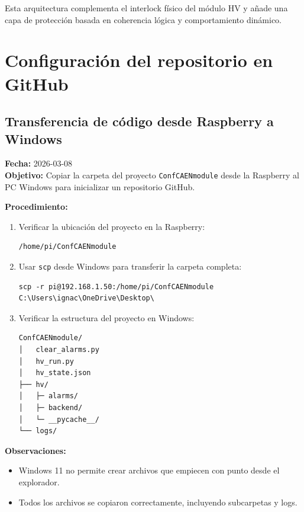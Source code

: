 \documentclass{article}
\begin{document}
Esta arquitectura complementa el interlock físico del módulo HV y añade
una capa de protección basada en coherencia lógica y comportamiento dinámico.

\section{Configuración del repositorio en GitHub}

\subsection{Transferencia de código desde Raspberry a Windows}

\textbf{Fecha:} 2026-03-08 \\
\textbf{Objetivo:} Copiar la carpeta del proyecto \texttt{ConfCAENmodule} desde la Raspberry al PC Windows para inicializar un repositorio GitHub.

\textbf{Procedimiento:}

\begin{enumerate}
    \item Verificar la ubicación del proyecto en la Raspberry:
    \begin{verbatim}
/home/pi/ConfCAENmodule
    \end{verbatim}
    
    \item Usar \texttt{scp} desde Windows para transferir la carpeta completa:
    \begin{verbatim}
scp -r pi@192.168.1.50:/home/pi/ConfCAENmodule C:\Users\ignac\OneDrive\Desktop\
    \end{verbatim}

    \item Verificar la estructura del proyecto en Windows:
    \begin{verbatim}
ConfCAENmodule/
│   clear_alarms.py
│   hv_run.py
│   hv_state.json
├── hv/
│   ├─ alarms/
│   ├─ backend/
│   └─ __pycache__/
└── logs/
    \end{verbatim}
\end{enumerate}

\textbf{Observaciones:} 
\begin{itemize}
    \item Windows 11 no permite crear archivos que empiecen con punto desde el explorador.
    \item Todos los archivos se copiaron correctamente, incluyendo subcarpetas y logs.
\end{itemize}
\end{document}
